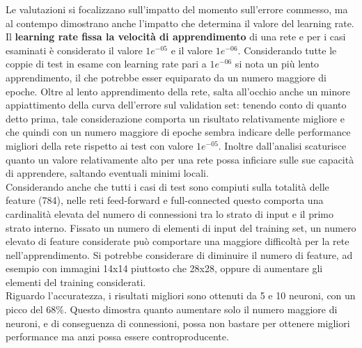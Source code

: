 Le valutazioni si focalizzano sull'impatto del momento sull'errore commesso, ma al contempo dimostrano anche l'impatto che determina il valore del learning rate. Il \textbf{learning rate fissa la velocità di apprendimento} di una rete e per i casi esaminati è considerato il valore $1e^{-05}$ e il valore $1e^{-06}$. Considerando tutte le coppie di test in esame con learning rate pari a $1e^{-06}$ si nota un più lento apprendimento, il che potrebbe esser equiparato da un numero maggiore di epoche. Oltre al lento apprendimento della rete, salta all'occhio anche un minore appiattimento della curva dell'errore sul validation set: tenendo conto di quanto detto prima, tale considerazione comporta un risultato relativamente migliore e che quindi con un numero maggiore di epoche sembra indicare delle performance migliori della rete rispetto ai test con valore $1e^{-05}$. Inoltre dall'analisi scaturisce quanto un valore relativamente alto per una rete possa inficiare sulle sue capacità di apprendere, saltando eventuali minimi locali. \\
Considerando anche che tutti i casi di test sono compiuti sulla totalità delle feature (784), nelle reti feed-forward e full-connected questo comporta una cardinalità elevata del numero di connessioni tra lo strato di input e il primo strato interno. Fissato un numero di elementi di input del training set, un numero elevato di feature considerate può comportare una maggiore difficoltà per la rete nell'apprendimento. Si potrebbe considerare di diminuire il numero di feature, ad esempio con immagini 14x14 piuttosto che 28x28, oppure di aumentare gli elementi del training considerati. \\ 
Riguardo l'accuratezza, i risultati migliori sono ottenuti da 5 e 10 neuroni, con un picco del $68\%$. Questo dimostra quanto aumentare solo il numero maggiore di neuroni, e di conseguenza di connessioni, possa non bastare per ottenere migliori performance ma anzi possa essere controproducente.  